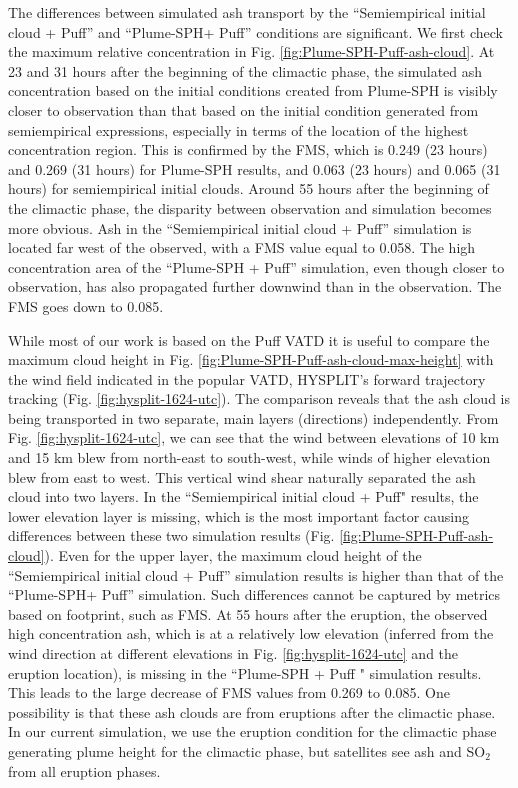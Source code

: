 \documentclass[utf8]{frontiersSCNS} %
\begin{document}
The differences between simulated ash transport by the ``Semiempirical initial cloud + Puff'' and ``Plume-SPH+ Puff'' conditions are significant. We first check the maximum relative concentration in Fig. \ref{fig:Plume-SPH-Puff-ash-cloud}. At 23 and 31 hours after the beginning of the climactic phase, the simulated ash concentration based on the initial conditions created from Plume-SPH is visibly closer to observation than that based on the initial condition generated from semiempirical expressions, especially in terms of the location of the highest concentration region. This is confirmed by the FMS, which is 0.249 (23 hours) and 0.269 (31 hours) for Plume-SPH results, and 0.063 (23 hours) and 0.065 (31 hours) for semiempirical initial clouds. Around 55 hours after the beginning of the climactic phase, the disparity between observation and simulation becomes more obvious. Ash in the ``Semiempirical initial cloud + Puff'' simulation is located far west of the observed, with a FMS value equal to 0.058. The high concentration area of the ``Plume-SPH + Puff'' simulation, even though closer to observation, has also propagated further downwind  than in the observation. The FMS goes down to 0.085.

While most of our work is based on the Puff VATD it is useful to compare the maximum cloud height in
Fig. \ref{fig:Plume-SPH-Puff-ash-cloud-max-height} with the wind field
indicated in the popular VATD, HYSPLIT's \citep{stein2015noaa, rolph2017real} forward trajectory tracking (Fig. \ref{fig:hysplit-1624-utc}).  The comparison reveals that
the ash cloud is being transported in two separate, main layers
(directions) independently. From Fig. \ref{fig:hysplit-1624-utc}, we
can see that the wind between elevations of 10 km and 15 km blew from
north-east to south-west, while winds of higher elevation blew from
east to west. This vertical wind shear naturally separated the ash cloud
into two layers.  In the ``Semiempirical initial cloud + Puff"
results, the lower elevation layer is missing, which is the most important factor causing differences between these two simulation
results (Fig. \ref{fig:Plume-SPH-Puff-ash-cloud}). Even for the upper
layer, the maximum cloud height of the ``Semiempirical initial cloud +
Puff'' simulation results is higher than that of the ``Plume-SPH+ Puff''
simulation. Such differences cannot be captured by metrics based on
footprint, such as FMS.  At 55 hours after the eruption, the observed
high concentration ash, which is at a relatively low elevation
(inferred from the wind direction at different elevations in
Fig. \ref{fig:hysplit-1624-utc} and the eruption location), is missing
in the ``Plume-SPH + Puff " simulation results. This leads to the large
decrease of FMS values from 0.269 to 0.085. One possibility is that
these ash clouds are from eruptions after the climactic phase. In our
current simulation, we use the eruption condition for the climactic
phase generating plume height for the climactic phase, but satellites
see ash and SO$_2$ from all eruption phases.
\end{document}
